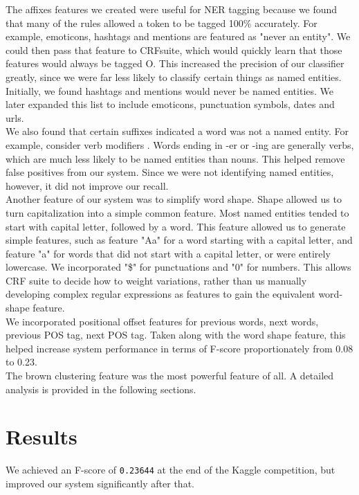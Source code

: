 \documentclass[a4paper]{article}
\begin{document}
The affixes features we created were useful for NER tagging because we found that many of the rules allowed a token to be tagged 100\% accurately. For example, emoticons, hashtags and mentions are featured as "never an entity". We could then pass that feature to CRFsuite, which would quickly learn that those features would always be tagged O. This increased the precision of our classifier greatly, since we were far less likely to classify certain things as named entities. Initially, we found hashtags and mentions would never be named entities. We later expanded this list to include emoticons, punctuation symbols, dates and urls. \\

We also found that certain suffixes indicated a word was not a named entity. For example, consider verb modifiers . Words ending in -er or -ing are generally verbs, which are much less likely to be named entities than nouns. This helped remove false positives from our system. Since we were not identifying named entities, however, it did not improve our recall.  \\

Another feature of our system was to simplify word shape. Shape allowed us to turn capitalization into a simple common feature.  Most named entities tended to start with capital letter, followed by a word. This feature allowed us to generate simple features, such as feature "Aa" for a word starting with a capital letter, and feature "a" for words that did not start with a capital letter, or were entirely lowercase. We incorporated "\$" for punctuations and "0" for numbers. This allows CRF suite to decide how to weight variations, rather than us manually developing complex regular expressions as features to gain the equivalent word-shape feature. \\

We incorporated positional offset features for previous words, next words, previous POS tag, next POS tag. Taken along with the word shape feature, this helped increase system performance in terms of F-score proportionately from 0.08 to 0.23. \\

The brown clustering feature was the most powerful feature of all. A detailed analysis is provided in the following sections. 


\section{Results}
We achieved an F-score of \texttt{0.23644} at the end of the Kaggle competition, but improved our system significantly after that. \\
\end{document}
